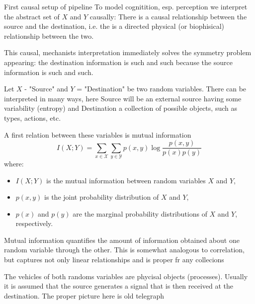\documentclass[10pt, aspectratio=169, handout]{beamer}
\begin{document}
\begin{frame} {First causal  setup of pipeline  }
To model cognitition, esp. perception we interpret the abstract set of \(X\) and \(Y\) causally:
There is a causal relationship between the source and the destination, i.e. the is a directed  physical (or biophisical) relationship between the two.

This causal, mechanists interpretation immediately solves the symmetry problem appearing: the destination information is such and such because the source information is such and such.

Let \(X\) - "Source" and \(Y\) = "Destination" be two random variables. 
There can be interpreted in many ways, here Source will be an external source having some variability (entropy) and Destination a collection of possible objects, such as types, actions, etc.

A first relation between these variables is mutual information 
\[
I(X;Y) = \sum_{x \in \mathcal{X}} \sum_{y \in \mathcal{Y}} p(x, y) \log \frac{p(x, y)}{p(x)p(y)}
\]
where:
\begin{itemize}
    \item \(I(X;Y)\) is the mutual information between random variables \(X\) and \(Y\),
    \item \(p(x, y)\) is the joint probability distribution of \(X\) and \(Y\),
    \item \(p(x)\) and \(p(y)\) are the marginal probability distributions of \(X\) and \(Y\), respectively.
\end{itemize}
Mutual information quantifies the amount of information obtained about one random variable through the other.
This is somewhat analogous to correlation, but captures not only linear relationships and is proper fr any collecions 


The vehicles of both randoms variables are phycisal objects (processes).
Usually it is assumed that the source generates a signal that is then received  at the destination.
The proper picture here is old telegraph


\end{frame}
\end{document}
